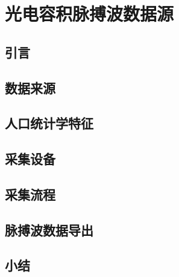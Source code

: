 \chapter{光电容积脉搏波数据源}
\section{引言}
\section{数据来源}
\section{人口统计学特征}
\section{采集设备}
\section{采集流程}
\section{脉搏波数据导出}
\section{小结}